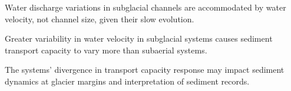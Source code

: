 \documentclass[draft]{agujournal2019}
\begin{document}





\begin{keypoints}
\item Water discharge variations in subglacial channels are accommodated by water velocity, not channel size, given their slow evolution.

\item  Greater variability in water velocity in subglacial systems causes sediment transport capacity to vary more than subaerial systems.


\item The systems' divergence in transport capacity response may impact sediment dynamics at glacier margins and interpretation of sediment records.
\end{keypoints}


% 
% 

% 
% 
\end{document}
